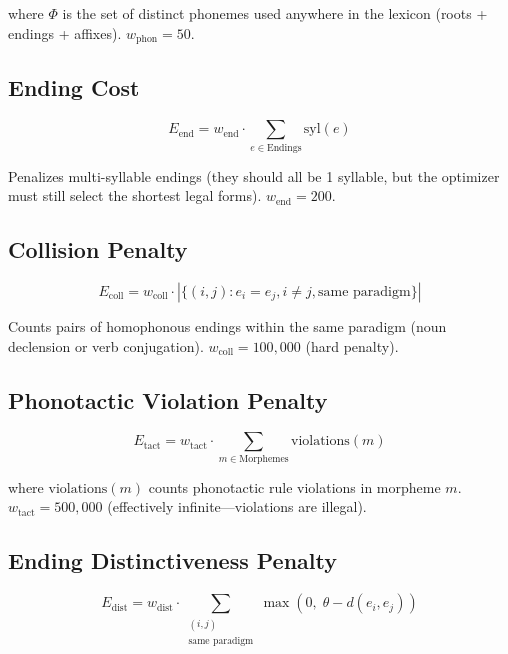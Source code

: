 \documentclass[12pt]{book}
\begin{document}
where $\Phi$ is the set of distinct phonemes used anywhere in the lexicon
(roots + endings + affixes). $w_{\text{phon}} = 50$.

\subsection{Ending Cost}

\begin{equation}
E_{\text{end}} = w_{\text{end}} \cdot \sum_{e \in \text{Endings}} \text{syl}(e)
\end{equation}

Penalizes multi-syllable endings (they should all be 1 syllable, but the
optimizer must still select the shortest legal forms). $w_{\text{end}} = 200$.

\subsection{Collision Penalty}

\begin{equation}
E_{\text{coll}} = w_{\text{coll}} \cdot |\{(i,j) : e_i = e_j, i \neq j, \text{same paradigm}\}|
\end{equation}

Counts pairs of homophonous endings within the same paradigm (noun declension
or verb conjugation). $w_{\text{coll}} = 100{,}000$ (hard penalty).

\subsection{Phonotactic Violation Penalty}

\begin{equation}
E_{\text{tact}} = w_{\text{tact}} \cdot \sum_{m \in \text{Morphemes}} \text{violations}(m)
\end{equation}

where $\text{violations}(m)$ counts phonotactic rule violations in morpheme $m$.
$w_{\text{tact}} = 500{,}000$ (effectively infinite---violations are illegal).

\subsection{Ending Distinctiveness Penalty}

\begin{equation}
E_{\text{dist}} = w_{\text{dist}} \cdot \sum_{\substack{(i,j) \\ \text{same paradigm}}} \max(0, \; \theta - d(e_i, e_j))
\end{equation}
\end{document}
